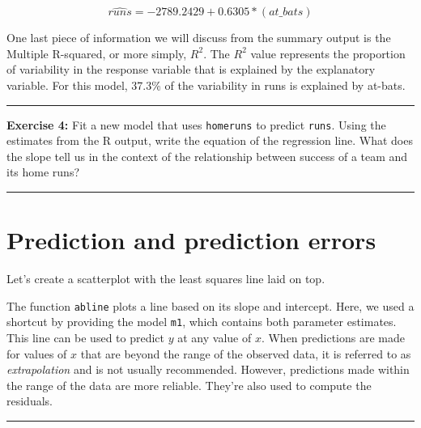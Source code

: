 \documentclass[]{book}
\newenvironment{Shaded}{\begin{snugshade}}{\end{snugshade}}
\newcommand{\KeywordTok}[1]{\textcolor[rgb]{0.13,0.29,0.53}{\textbf{#1}}}
\newcommand{\StringTok}[1]{\textcolor[rgb]{0.31,0.60,0.02}{#1}}
\newcommand{\OperatorTok}[1]{\textcolor[rgb]{0.81,0.36,0.00}{\textbf{#1}}}
\newcommand{\NormalTok}[1]{#1}
\theoremstyle{definition}
\theoremstyle{definition}
\theoremstyle{definition}
\theoremstyle{remark}
\begin{document}
\[
  \widehat{runs} = -2789.2429 + 0.6305 * (at\_bats)
\]

One last piece of information we will discuss from the summary output is
the Multiple R-squared, or more simply, \(R^2\). The \(R^2\) value
represents the proportion of variability in the response variable that
is explained by the explanatory variable. For this model, 37.3\% of the
variability in runs is explained by at-bats.

\begin{center}\rule{0.5\linewidth}{\linethickness}\end{center}

\textbf{Exercise 4:} Fit a new model that uses \texttt{homeruns} to
predict \texttt{runs}. Using the estimates from the R output, write the
equation of the regression line. What does the slope tell us in the
context of the relationship between success of a team and its home runs?

\begin{center}\rule{0.5\linewidth}{\linethickness}\end{center}

\section{Prediction and prediction
errors}\label{prediction-and-prediction-errors}

Let's create a scatterplot with the least squares line laid on top.

\begin{Shaded}
\end{Shaded}

The function \texttt{abline} plots a line based on its slope and
intercept. Here, we used a shortcut by providing the model \texttt{m1},
which contains both parameter estimates. This line can be used to
predict \(y\) at any value of \(x\). When predictions are made for
values of \(x\) that are beyond the range of the observed data, it is
referred to as \emph{extrapolation} and is not usually recommended.
However, predictions made within the range of the data are more
reliable. They're also used to compute the residuals.

\begin{center}\rule{0.5\linewidth}{\linethickness}\end{center}
\end{document}

